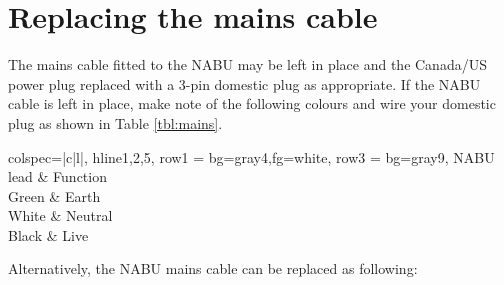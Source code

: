 \section{Replacing the mains cable}
The mains cable fitted to the NABU may be left in place and the Canada/US power plug replaced with a 3-pin domestic plug as appropriate. If the NABU cable is left in place, make note of the following colours and wire your domestic plug as shown in Table \ref{tbl:mains}.
\begin{center}
	\begin{tblr}{
			colspec={|c|l|},
			hline{1,2,5},
			row{1} = {bg=gray4,fg=white},
			row{3} = {bg=gray9},
		}
		NABU lead & Function \\
		Green & Earth \\
		White & Neutral \\
		Black & Live \\
	\end{tblr}
\end{center}
Alternatively, the NABU mains cable can be replaced as following:
